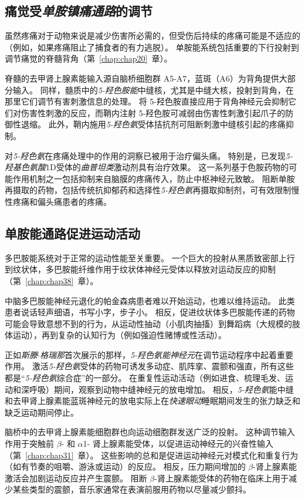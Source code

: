 \subsection{痛觉受\textit{单胺镇痛通路}的调节}

虽然疼痛对于动物来说是减少伤害所必需的，但受伤后持续的疼痛可能是不适应的（例如，如果疼痛阻止了捕食者的有力逃脱）。
单胺能系统包括重要的下行投射到调节痛觉的脊髓背角（第~\ref{chap:chap20}~章）。


脊髓的去甲肾上腺素能输入源自脑桥细胞群 A5-A7，蓝斑（A6）为背角提供大部分输入。
同样，髓质中的\textit{5-羟色胺能}中缝核，尤其是中缝大核，投射到背角，在那里它们调节有害刺激信息的处理。
将 5-羟色胺直接应用于背角神经元会抑制它们对伤害性刺激的反应，而鞘内注射 5-羟色胺可减弱由伤害性刺激引起爪子的防御性退缩。
此外，鞘内施用\textit{5-羟色氨}受体拮抗剂可阻断刺激中缝核引起的疼痛抑制。


对\textit{5-羟色氨}在疼痛处理中的作用的洞察已被用于治疗偏头痛。
特别是，已发现\textit{5-羟基色氨酸}1D受体的\textit{曲普坦类}激动剂具有治疗效果。
这一系列基于色胺药物的可能作用机制之一包括抑制来自脑膜的疼痛传入，防止中枢神经元致敏。
阻断单胺再摄取的药物，包括传统抗抑郁药和选择性\textit{5-羟色氨}再摄取抑制剂，可有效限制慢性疼痛和偏头痛患者的疼痛。



\subsection{单胺能通路促进运动活动}

多巴胺能系统对于正常的运动性能至关重要。
一个巨大的投射从黑质致密部上行到纹状体，多巴胺能纤维作用于纹状体神经元受体以释放对运动反应的抑制（第~\ref{chap:chap38}~章）。


中脑多巴胺能神经元退化的帕金森病患者难以开始运动，也难以维持运动。
此类患者说话轻声细语，书写小字，步子小。
相反，促进纹状体多巴胺能传递的药物可能会导致意想不到的行为，从运动性抽动（小肌肉抽搐）到舞蹈病（大规模的肢体运动），再到复杂的认知行为（例如强迫性赌博或性活动）。


正如\textit{斯滕$\cdot$格瑞那}首次展示的那样，\textit{5-羟色氨能神经元}在调节运动程序中起着重要作用。
激活\textit{5-羟色氨}受体的药物可诱发多动症、肌阵挛、震颤和强直，所有这些都是“\textit{5-羟色氨}综合症”的一部分。
在重复性运动活动（例如进食、梳理毛发、运动和深呼吸）期间，观察到动物中缝神经元的放电增加。
相反，\textit{5-羟色氨}能中缝和去甲肾上腺素能蓝斑神经元的放电实际上在\textit{快速眼动}睡眠期间发生的张力缺乏和缺乏运动期间停止。


脑桥中的去甲肾上腺素能细胞群也向运动细胞群发送广泛的投射。
这种调节输入作用于突触前 $\beta$- 和 $\alpha$1- 肾上腺素能受体，以促进运动神经元的兴奋性输入（第~\ref{chap:chap31}~章）。
这些影响的总和是促进运动神经元对模式化和重复行为（如有节奏的咀嚼、游泳或运动）的反应。
相反，压力期间增加的 $\beta$-肾上腺素能激活会加剧运动反应并产生震颤。
阻断 $\beta$-肾上腺素能受体的药物在临床上用于减少某些类型的震颤，音乐家通常在表演前服用药物以尽量减少颤抖。



